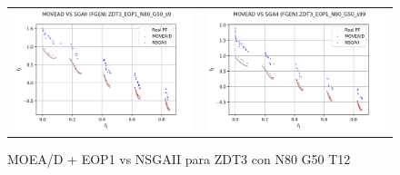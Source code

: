 \begin{figure}[H]
\begin{tabular}{c c}
    \includegraphics[scale=0.5]{figures/ZDT3_EOP1_N80_G50_T12/s9_comp.png} &
    \includegraphics[scale=0.5]{figures/ZDT3_EOP1_N80_G50_T12/s99_comp.png}\\
    \end{tabular}
    \caption{\centering MOEA/D + EOP1 vs NSGAII para ZDT3 con N80 G50 T12}
    \label{fig:15}
\end{figure}